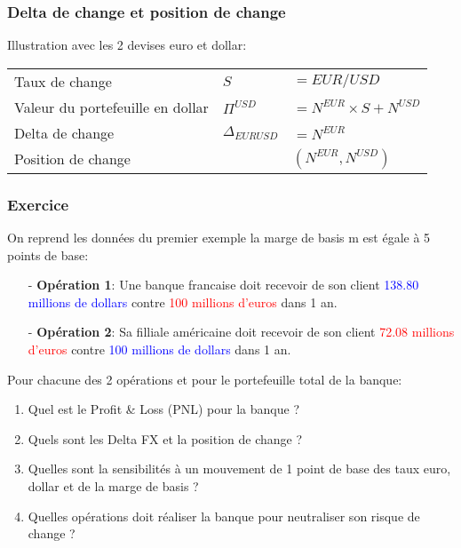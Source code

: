 \documentclass{beamer}
\begin{document}
\begin{frame}
\frametitle{Delta de change et position de change}
\small
Illustration avec les 2 devises euro et dollar:\\ 
\vspace{0.5cm}
\begin{tabular}{|l|l l|}
\hline
Taux de change&$S$&$= EUR/USD$\\
Valeur du portefeuille en dollar&$\Pi^{USD}$&$=N^{EUR} \times S + N^{USD}$\\
Delta de change&$\Delta_{EURUSD}$&$=N^{EUR}$\\
Position de change&&$(N^{EUR},N^{USD})$\\
\hline
\end{tabular}
\end{frame}

\begin{frame}
\frametitle{Exercice}
On reprend les données du premier exemple la marge de basis m est égale à 5 points de base:\\
\begin{itemize}
\item[-] \textbf{Opération 1}: Une banque francaise doit recevoir de son client \textcolor{blue}{138.80 millions de dollars} contre \textcolor{red}{100 millions d'euros} dans 1 an.
\item[-] \textbf{Opération 2}: Sa filliale américaine doit recevoir de son client \textcolor{red}{72.08 millions d'euros} contre \textcolor{blue}{100 millions de dollars} dans 1 an.
\end{itemize}
Pour chacune des 2 opérations et pour le portefeuille total de la banque:\\
\begin{enumerate}
\item Quel est le Profit \& Loss (PNL) pour la banque ?
\item Quels sont les Delta FX et la position de change ?
\item Quelles sont la sensibilités à un mouvement de 1 point de base des taux euro, dollar et de la marge de basis ?
\item Quelles opérations doit réaliser la banque pour neutraliser son risque de change ?
\end{enumerate}
\end{frame}
\end{document}
